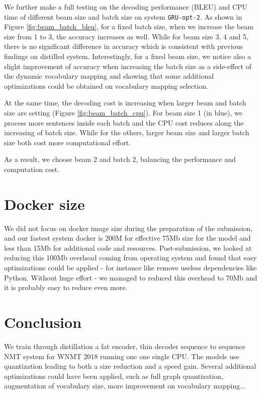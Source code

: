 \documentclass[11pt,a4paper]{article}
\begin{document}
We further make a full testing on the decoding performance (BLEU) and CPU time of different beam size and batch size on system {\tt GRU-opt-2}.
As shown in Figure \ref{fig:beam_batch_bleu}, for a fixed batch size, when we increase the beam size from 1 to 3, the accuracy increases as well.
While for beam size 3, 4 and 5, there is no significant difference in accuracy which is consistent with previous findings on distilled system.
Interestingly, for a fixed beam size, we notice also a slight improvement of accuracy when increasing the batch size as a side-effect of the dynamic vocabulary mapping and showing that some additional optimizations could be obtained on vocabulary mapping selection.



At the same time, the decoding cost is increasing when larger beam and batch size are setting (Figure \ref{fig:beam_batch_cpu}).
For beam size 1 (in blue), we process more sentences inside each batch and the CPU cost reduces along the increasing of batch size.
While for the others, larger beam size and larger batch size both cost more computational effort.

As a result, we choose beam 2 and batch 2, balancing the performance and computation cost.



\section{Docker size}
We did not focus on docker image size during the preparation of the submission, and our fastest system docker is 200M for effective 75Mb size for the model and less than 15Mb for additional code and resources. Post-submission, we looked at reducing this 100Mb overhead coming from operating system and found that easy optimizations could be applied - for instance like remove useless dependencies like Python. Without huge effort - we managed to reduced this overhead to 70Mb and it is probably easy to reduce even more.

\section{Conclusion}

We train through distillation a fat encoder, thin decoder sequence to sequence NMT system for WNMT 2018 running one one single CPU. The models use quantization leading to both a size reduction and a speed gain. Several additional optimizations could have been applied, such as full graph quantization, augmentation of vocabulary size, more improvement on vocabulary mapping...
\end{document}
